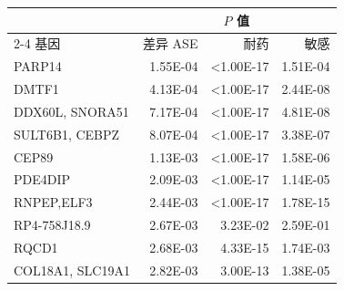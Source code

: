 \begin{table}[htbp]
\centering\small
{}
\begin{tabular}{lrrr}
\toprule
&\multicolumn{3}{c}{$P$ 值}\\
\cmidrule(lr){2-4}
基因&差异 ASE&耐药&敏感\\
\midrule
PARP14&1.55E-04&\textnormal{<1.00E-17}&1.51E-04\\
DMTF1&4.13E-04&\textnormal{<1.00E-17}&2.44E-08\\
DDX60L, SNORA51&7.17E-04&\textnormal{<1.00E-17}&4.81E-08\\
SULT6B1, CEBPZ&8.07E-04&\textnormal{<1.00E-17}&3.38E-07\\
CEP89&1.13E-03&\textnormal{<1.00E-17}&1.58E-06\\
PDE4DIP&2.09E-03&\textnormal{<1.00E-17}&1.14E-05\\
RNPEP,ELF3&2.44E-03&\textnormal{<1.00E-17}&1.78E-15\\
RP4-758J18.9&2.67E-03&3.23E-02&2.59E-01\\
RQCD1&2.68E-03&4.33E-15&1.74E-03\\
COL18A1, SLC19A1&2.82E-03&3.00E-13&1.38E-05\\
\bottomrule
\end{tabular}
\end{table}
